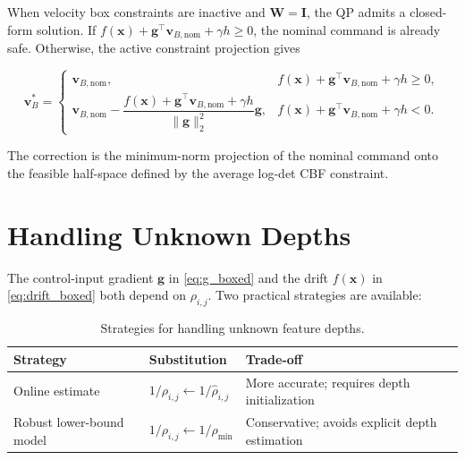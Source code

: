 \documentclass[11pt,a4paper]{article}
\begin{document}
When velocity box constraints are inactive and $\bm{W}=\bm{I}$, the QP admits
a closed-form solution.  If
$f(\bm{x})+\bm{g}^{\top}\bm{v}_{B,\mathrm{nom}}+\gamma h\ge0$, the nominal
command is already safe.  Otherwise, the active constraint projection gives
\begin{keyresult}
\begin{equation}
  \boxed{
  \bm{v}_{B}^{*}
  =
  \begin{cases}
  \bm{v}_{B,\mathrm{nom}},
  & f(\bm{x}) + \bm{g}^{\top}\bm{v}_{B,\mathrm{nom}} + \gamma h
  \ge 0,\\[6pt]
  \bm{v}_{B,\mathrm{nom}}
  -\dfrac{f(\bm{x}) + \bm{g}^{\top}\bm{v}_{B,\mathrm{nom}} + \gamma h}
  {\|\bm{g}\|_{2}^{2}}\bm{g},
  & f(\bm{x}) + \bm{g}^{\top}\bm{v}_{B,\mathrm{nom}} + \gamma h
  < 0.
  \end{cases}}
  \label{eq:closed_form_average}
\end{equation}
\end{keyresult}
The correction is the minimum-norm projection of the nominal command onto the
feasible half-space defined by the average log-det CBF constraint.

\section{Handling Unknown Depths}

The control-input gradient $\bm{g}$ in \eqref{eq:g_boxed} and the drift
$f(\bm{x})$ in \eqref{eq:drift_boxed} both depend on
$\rho_{i,j}$.  Two practical strategies are available:
\begin{table}[h]
\centering
\renewcommand{\arraystretch}{1.35}
\begin{tabular}{lll}
\toprule
\textbf{Strategy} & \textbf{Substitution} & \textbf{Trade-off} \\
\midrule
Online estimate
& $1/\rho_{i,j}\leftarrow1/\hat{\rho}_{i,j}$
& More accurate; requires depth initialization \\
Robust lower-bound model
& $1/\rho_{i,j}\leftarrow1/\rho_{\min}$
& Conservative; avoids explicit depth estimation \\
\bottomrule
\end{tabular}
\caption{Strategies for handling unknown feature depths.}
\label{tab:depth_multi}
\end{table}

\end{document}
